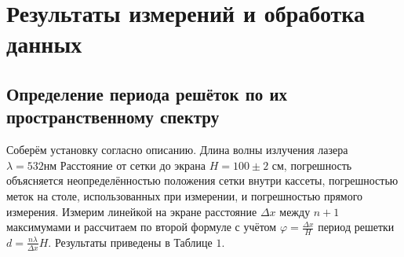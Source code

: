 \section*{Результаты измерений и обработка данных}

\subsection*{Определение периода решёток по их пространственному спектру}

Соберём установку согласно описанию. Длина волны излучения лазера $\lambda=532 \mathrm{нм}$
Расстояние от сетки до экрана $H=100 \pm 2$ см, погрешность объясняется неопределённостью положения сетки внутри кассеты, погрешностью меток на столе, использованных при измерении, и погрешностью прямого измерения. Измерим линейкой на экране расстояние $\Delta x$ между $n+1$ максимумами и рассчитаем по второй формуле с учётом $\varphi=\frac{\Delta x}{H}$ период решетки $d = \frac{n\lambda}{\Delta x}H$. Результаты приведены в Таблице $1 .$

